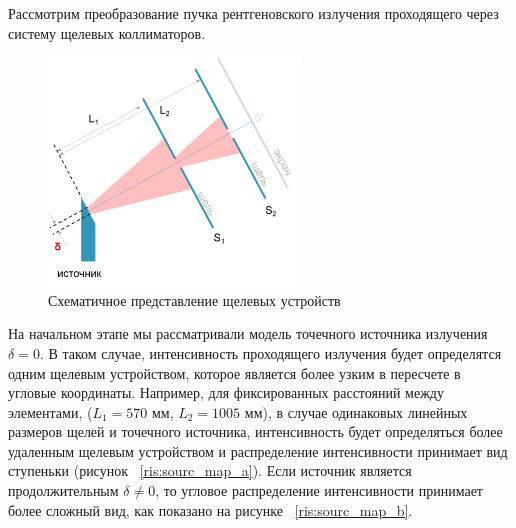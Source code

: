 \label{sec:slits_section}
Рассмотрим преобразование пучка рентгеновского излучения проходящего через систему щелевых коллиматоров.
\begin{figure}[H]
  \centering
  \includegraphics[width=0.6\textwidth]{images/for_slits.png}
  \caption{Схематичное представление щелевых устройств}
  \label{ris:for_slits}
\end{figure}

На начальном этапе мы рассматривали модель точечного источника излучения $\delta = 0$.
В таком случае, интенсивность проходящего излучения будет определятся
одним щелевым устройством, которое является более узким в пересчете в угловые
координаты. Например, для фиксированных расстояний между элементами,
($L_1 = 570$ мм, $L_2 = 1005$ мм), в случае одинаковых линейных размеров щелей и точечного
источника, интенсивность будет определяться более удаленным щелевым устройством и
распределение интенсивности принимает вид ступеньки (рисунок ~\ref{ris:sourc_map_a}). Если источник является
продолжительным $\delta \neq 0$, то угловое распределение интенсивности принимает более сложный вид, как показано на рисунке ~\ref{ris:sourc_map_b}.



